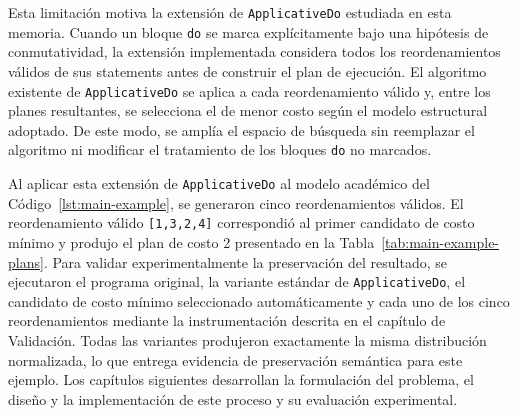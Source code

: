 Esta limitación motiva la extensión de \texttt{ApplicativeDo} estudiada en esta memoria. Cuando un bloque \texttt{do} se marca explícitamente bajo una hipótesis de conmutatividad, la extensión implementada considera todos los reordenamientos válidos de sus statements antes de construir el plan de ejecución. El algoritmo existente de \texttt{ApplicativeDo} se aplica a cada reordenamiento válido y, entre los planes resultantes, se selecciona el de menor costo según el modelo estructural adoptado. De este modo, se amplía el espacio de búsqueda sin reemplazar el algoritmo ni modificar el tratamiento de los bloques \texttt{do} no marcados.

Al aplicar esta extensión de \texttt{ApplicativeDo} al modelo académico del Código~\ref{lst:main-example}, se generaron cinco reordenamientos válidos. El reordenamiento válido \texttt{[1,3,2,4]} correspondió al primer candidato de costo mínimo y produjo el plan de costo 2 presentado en la Tabla~\ref{tab:main-example-plans}. Para validar experimentalmente la preservación del resultado, se ejecutaron el programa original, la variante estándar de \texttt{ApplicativeDo}, el candidato de costo mínimo seleccionado automáticamente y cada uno de los cinco reordenamientos mediante la instrumentación descrita en el capítulo de Validación. Todas las variantes produjeron exactamente la misma distribución normalizada, lo que entrega evidencia de preservación semántica para este ejemplo. Los capítulos siguientes desarrollan la formulación del problema, el diseño y la implementación de este proceso y su evaluación experimental.
